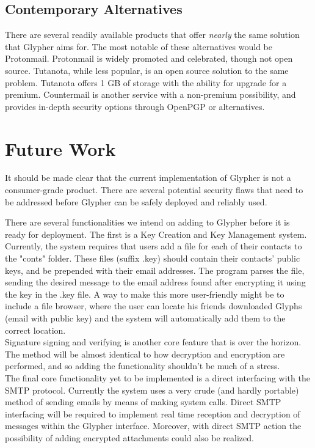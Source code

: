 \documentclass[journal]{IEEEtran}
\begin{document}
\subsection{Contemporary Alternatives}

There are several readily available products that offer \textit{nearly} the same solution that Glypher aims for. The most notable of these alternatives would be Protonmail. Protonmail is widely promoted and celebrated, though not open source. Tutanota, while less popular, is an open source solution to the same problem. Tutanota offers 1 GB of storage with the ability for upgrade for a premium. Countermail is another service with a non-premium possibility, and provides in-depth security options through OpenPGP or alternatives.\\


\section{Future Work}

It should be made clear that the current implementation of Glypher is not a consumer-grade product. There are several potential security flaws that need to be addressed before Glypher can be safely deployed and reliably used.

There are several functionalities we intend on adding to Glypher before it is ready for deployment. The first is a Key Creation and Key Management system. Currently, the system requires that users add a file for each of their contacts to the "conts" folder. These files (suffix .key) should contain their contacts' public keys, and be prepended with their email addresses. The program parses the file, sending the desired message to the email address found after encrypting it using the key in the .key file. A way to make this more user-friendly might be to include a file browser, where the user can locate his friends downloaded Glyphs (email with public key) and the system will automatically add them to the correct location.\\
Signature signing and verifying is another core feature that is over the horizon. The method will be almost identical to how decryption and encryption are performed, and so adding the functionality shouldn't be much of a stress.\\ 
The final core functionality yet to be implemented is a direct interfacing with the SMTP protocol. Currently the system uses a very crude (and hardly portable) method of sending emails by means of making system calls. Direct SMTP interfacing will be required to implement real time reception and decryption of messages within the Glypher interface. Moreover, with direct SMTP action the possibility of adding encrypted attachments could also be realized.
\end{document}
